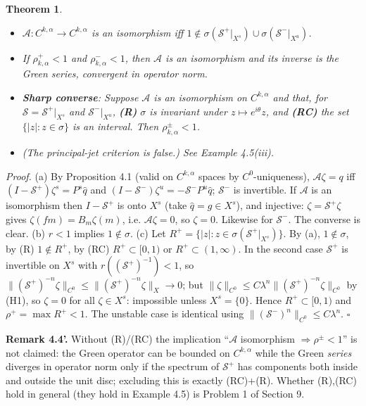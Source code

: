 \documentclass[11pt,a4paper]{article}
\theoremstyle{plain}
\newtheorem{theorem}{Theorem}[section]
\theoremstyle{definition}
\theoremstyle{remark}
\numberwithin{equation}{section}
\numberwithin{figure}{section}
\begin{document}
\begin{theorem}
    \begin{itemize}
        \item[(a)] $\mathcal A:C^{k,\alpha}\to C^{k,\alpha}$ is an isomorphism iff $1\notin\sigma(\mathcal S^+|_{X^s})\cup\sigma(\mathcal S^-|_{X^u})$.
        \item[(b)] If $\rho^+_{k,\alpha}<1$ and $\rho^-_{k,\alpha}<1$, then $\mathcal A$ is an isomorphism and its inverse is the Green series, convergent in operator norm.
        \item[(c)] \textbf{Sharp converse}: Suppose $\mathcal A$ is an isomorphism on $C^{k,\alpha}$ and that, for $\mathcal S=\mathcal S^+|_{X^s}$ and $\mathcal S^-|_{X^u}$, \textbf{(R)} $\sigma$ is invariant under $z\mapsto e^{i\theta}z$, and \textbf{(RC)} the set $\{|z|:z\in\sigma\}$ is an interval. Then $\rho^\pm_{k,\alpha}<1$.
        \item[(d)] (The principal-jet criterion is false.) See Example 4.5(iii).
    \end{itemize}
\end{theorem}

\textit{Proof.} (a) By Proposition 4.1 (valid on $C^{k,\alpha}$ spaces by $C^0$-uniqueness), $\mathcal A\zeta=q$ iff $(I-\mathcal S^+)\zeta^s=P^s\hat q$ and $(I-\mathcal S^-)\zeta^u=-\mathcal S^-P^u\hat q$; $\mathcal S^-$ is invertible. If $\mathcal A$ is an isomorphism then $I-\mathcal S^+$ is onto $X^s$ (take $\hat q=g\in X^s$), and injective: $\zeta=\mathcal S^+\zeta$ gives $\zeta(fm)=B_m\zeta(m)$, i.e. $\mathcal A\zeta=0$, so $\zeta=0$. Likewise for $\mathcal S^-$. The converse is clear.
(b) $r<1$ implies $1\notin\sigma$.
(c) Let $R^+=\{|z|:z\in\sigma(\mathcal S^+|_{X^s})\}$. By (a), $1\notin\sigma$, by (R) $1\notin R^+$, by (RC) $R^+\subset[0,1)$ or $R^+\subset(1,\infty)$. In the second case $\mathcal S^+$ is invertible on $X^s$ with $r((\mathcal S^+)^{-1})<1$, so $\|(\mathcal S^+)^{-n}\zeta\|_{C^0}\le\|(\mathcal S^+)^{-n}\zeta\|_{X}\to0$; but $\|\zeta\|_{C^0}\le C\lambda^n\|(\mathcal S^+)^{-n}\zeta\|_{C^0}$ by (H1), so $\zeta=0$ for all $\zeta\in X^s$: impossible unless $X^s=\{0\}$. Hence $R^+\subset[0,1)$ and $\rho^+=\max R^+<1$. The unstable case is identical using $\|(\mathcal S^-)^n\|_{C^0}\le C\lambda^n$. $\square$

\textbf{Remark 4.4'.} Without (R)/(RC) the implication ``$\mathcal A$ isomorphism $\Rightarrow\rho^\pm<1$'' is not claimed: the Green operator can be bounded on $C^{k,\alpha}$ while the Green \textit{series} diverges in operator norm only if the spectrum of $\mathcal S^+$ has components both inside and outside the unit disc; excluding this is exactly (RC)+(R). Whether (R),(RC) hold in general (they hold in Example 4.5) is Problem 1 of Section 9.
\end{document}
